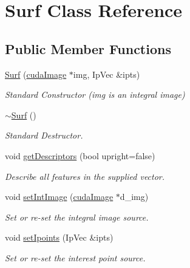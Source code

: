 \hypertarget{classSurf}{\section{Surf Class Reference}
\label{classSurf}
}
\subsection*{Public Member Functions}
\begin{DoxyCompactItemize}
\item 
\hyperlink{classSurf_ab9ee01d40280065f099d4c9fefabf651}{Surf} (\hyperlink{structcudaImage}{cuda\-Image} $\ast$img, Ip\-Vec \&ipts)
\begin{DoxyCompactList}\small\item\em Standard Constructor (img is an integral image) \end{DoxyCompactList}\item 
\hyperlink{classSurf_a77e73978bb51a350eec11e281aadef59}{$\sim$\-Surf} ()
\begin{DoxyCompactList}\small\item\em Standard Destructor. \end{DoxyCompactList}\item 
\hypertarget{classSurf_a4324cd0f1f87ec46b6186850929e858e}{void \hyperlink{classSurf_a4324cd0f1f87ec46b6186850929e858e}{get\-Descriptors} (bool upright=false)}\label{classSurf_a4324cd0f1f87ec46b6186850929e858e}

\begin{DoxyCompactList}\small\item\em Describe all features in the supplied vector. \end{DoxyCompactList}\item 
\hypertarget{classSurf_a45149e045846f8e68eb5e3c8287fd2a3}{void \hyperlink{classSurf_a45149e045846f8e68eb5e3c8287fd2a3}{set\-Int\-Image} (\hyperlink{structcudaImage}{cuda\-Image} $\ast$d\-\_\-img)}\label{classSurf_a45149e045846f8e68eb5e3c8287fd2a3}

\begin{DoxyCompactList}\small\item\em Set or re-\/set the integral image source. \end{DoxyCompactList}\item 
\hypertarget{classSurf_ac1294201cfcf6254cf0cbdca5997b101}{void \hyperlink{classSurf_ac1294201cfcf6254cf0cbdca5997b101}{set\-Ipoints} (Ip\-Vec \&ipts)}\label{classSurf_ac1294201cfcf6254cf0cbdca5997b101}

\begin{DoxyCompactList}\small\item\em Set or re-\/set the interest point source. \end{DoxyCompactList}\end{DoxyCompactItemize}



